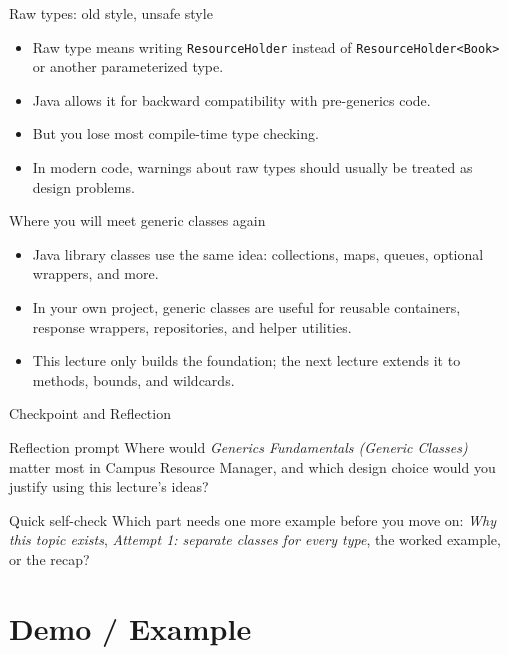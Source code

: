 \documentclass{beamer}
\begin{document}
\begin{frame}{Raw types: old style, unsafe style}
\begin{itemize}[<+->]
  \item Raw type means writing \texttt{ResourceHolder} instead of \texttt{ResourceHolder<Book>} or another parameterized type.
  \item Java allows it for backward compatibility with pre-generics code.
  \item But you lose most compile-time type checking.
  \item In modern code, warnings about raw types should usually be treated as design problems.
\end{itemize}
  \slidesources{\OOPSUnitIVSources}
\end{frame}

\begin{frame}{Where you will meet generic classes again}
\begin{itemize}[<+->]
  \item Java library classes use the same idea: collections, maps, queues, optional wrappers, and more.
  \item In your own project, generic classes are useful for reusable containers, response wrappers, repositories, and helper utilities.
  \item This lecture only builds the foundation; the next lecture extends it to methods, bounds, and wildcards.
\end{itemize}
  \slidesources{\OOPSUnitIVSources}
\end{frame}

\begin{frame}{Checkpoint and Reflection}
\begin{block}{Reflection prompt}
Where would \textit{Generics Fundamentals (Generic Classes)} matter most in Campus Resource Manager, and which design choice would you justify using this lecture's ideas?
\end{block}
\begin{block}{Quick self-check}
Which part needs one more example before you move on: \textit{Why this topic exists}, \textit{Attempt 1: separate classes for every type}, the worked example, or the recap?
\end{block}
  \slidesources{\OOPSUnitIVSources}
\end{frame}

\section{Demo / Example}
\label{sec:demo}
\end{document}
